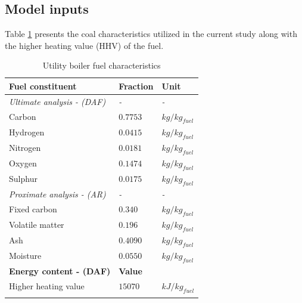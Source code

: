 \documentclass[11pt,cleanfoot]{asme2ej}
\begin{document}
\subsection{Model inputs}
Table \ref{tbl_fuel} presents the coal characteristics utilized in the current study along with the higher heating value (HHV) of the fuel.\\
\begin{table}[h!]
\centering
\caption{Utility boiler fuel characteristics}
\vspace{2mm}
\label{tbl_fuel}
\begin{tabularx}{0.7\textwidth}{p{} p{} l}
\hline
\textbf{Fuel constituent} & \textbf{Fraction} & \textbf{Unit}\\
\hline
\textit{Ultimate analysis - (DAF)} & \textit{-} & \textit{-}\\
Carbon & $0.7753$ & $kg/kg_{fuel}$\\
Hydrogen & $0.0415$ & $kg/kg_{fuel}$\\
Nitrogen & $0.0181$ & $kg/kg_{fuel}$\\
Oxygen & $0.1474$ & $kg/kg_{fuel}$\\
Sulphur & $0.0175$ & $kg/kg_{fuel}$\\
\textit{Proximate analysis - (AR)} & \textit{-} & \textit{-}\\
Fixed carbon & $0.340$ & $kg/kg_{fuel}$\\
Volatile matter & $0.196$ & $kg/kg_{fuel}$\\
Ash & $0.4090$ & $kg/kg_{fuel}$\\
Moisture & $0.0550$ & $kg/kg_{fuel}$\\
\hline
\textbf{Energy content - (DAF)} & \textbf{Value} &\\
\hline
Higher heating value & $15070$ & $kJ/kg_{fuel}$\\
\hline
\vspace{0pt}
\end{tabularx}
\end{table}
\end{document}
